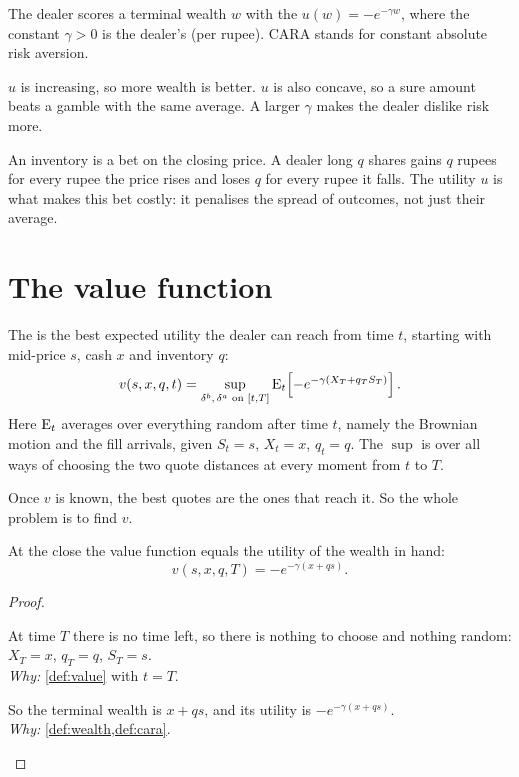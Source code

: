 \begin{definition}
\label{def:cara}
The dealer scores a terminal wealth $w$ with the  $u(w)=-e^{-\gamma w}$, where the constant $\gamma>0$ is the dealer's  (per rupee). CARA stands for constant absolute risk aversion.
\end{definition}

$u$ is increasing, so more wealth is better. $u$ is also concave, so a sure amount beats a gamble with the same average. A larger $\gamma$ makes the dealer dislike risk more.

\begin{intuition}
An inventory is a bet on the closing price. A dealer long $q$ shares gains $q$ rupees for every rupee the price rises and loses $q$ for every rupee it falls. The utility $u$ is what makes this bet costly: it penalises the spread of outcomes, not just their average.
\end{intuition}

\section{The value function}

\begin{definition}
\label{def:value}
The  is the best expected utility the dealer can reach from time $t$, starting with mid-price $s$, cash $x$ and inventory $q$:
\[
  v(s,x,q,t)=\sup_{\delta^b,\,\delta^a\text{ on }[t,T]}\operatorname{E}_t\!\left[-e^{-\gamma(X_T+q_TS_T)}\right].
\]
Here $\operatorname{E}_t$ averages over everything random after time $t$, namely the Brownian motion and the fill arrivals, given $S_t=s$, $X_t=x$, $q_t=q$. The $\sup$ is over all ways of choosing the two quote distances at every moment from $t$ to $T$.
\end{definition}

Once $v$ is known, the best quotes are the ones that reach it. So the whole problem is to find $v$.

\begin{result}
\label{res:end}
At the close the value function equals the utility of the wealth in hand:
\[
  v(s,x,q,T)=-e^{-\gamma(x+qs)}.
\]
\end{result}

\begin{proof}
\begin{steps}
  \item At time $T$ there is no time left, so there is nothing to choose and nothing random: $X_T=x$, $q_T=q$, $S_T=s$.
  \\ \emph{Why:} \cref{def:value} with $t=T$.
  \item So the terminal wealth is $x+qs$, and its utility is $-e^{-\gamma(x+qs)}$.
  \\ \emph{Why:} \cref{def:wealth,def:cara}.
\end{steps}
\end{proof}

